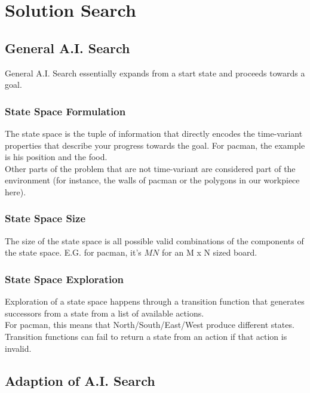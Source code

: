 								\chapter{Solution Search}

\section{General A.I. Search}

General A.I. Search essentially expands from a start state and proceeds towards a goal.

	\subsection{State Space Formulation}

The state space is the tuple of information that directly encodes the time-variant properties that describe your progress towards the goal. For pacman, the example is his position and the food.
\\

Other parts of the problem that are not time-variant are considered part of the environment (for instance, the walls of pacman or the polygons in our workpiece here).


	\subsection{State Space Size}
The size of the state space is all possible valid combinations of the components of the state space. E.G. for pacman, it's $MN$ for an M x N sized board.

	\subsection{State Space Exploration}

Exploration of a state space happens through a transition function that generates successors from a state from a list of available actions.
\\

For pacman, this means that North/South/East/West produce different states. Transition functions can fail to return a state from an action if that action is invalid.

\section{Adaption of A.I. Search}

